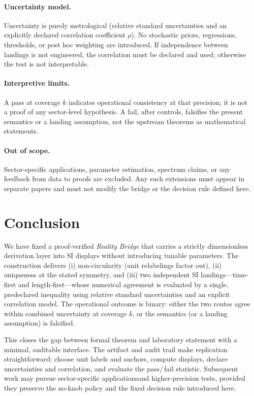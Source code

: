 \documentclass[11pt]{article}
\theoremstyle{plain}
\theoremstyle{definition}
\theoremstyle{remark}
\begin{document}
\paragraph{Uncertainty model.}
Uncertainty is purely metrological (relative standard uncertainties and an explicitly declared correlation coefficient \(\rho\)). No stochastic priors, regressions, thresholds, or post hoc weighting are introduced. If independence between landings is not engineered, the correlation must be declared and used; otherwise the test is not interpretable.

\paragraph{Interpretive limits.}
A pass at coverage \(k\) indicates operational consistency at that precision; it is not a proof of any sector-level hypothesis. A fail, after controls, falsifies the present semantics or a landing assumption, not the upstream theorems as mathematical statements.

\paragraph{Out of scope.}
Sector-specific applications, parameter estimation, spectrum claims, or any feedback from data to proofs are excluded. Any such extensions must appear in separate papers and must not modify the bridge or the decision rule defined here.

\section{Conclusion}

We have fixed a proof-verified \emph{Reality Bridge} that carries a strictly dimensionless derivation layer into SI displays without introducing tunable parameters. The construction delivers (i) non-circularity (unit relabelings factor out), (ii) uniqueness at the stated symmetry, and (iii) two independent SI landings—time-first and length-first—whose numerical agreement is evaluated by a single, pre\-declared inequality using relative standard uncertainties and an explicit correlation model. The operational outcome is binary: either the two routes agree within combined uncertainty at coverage \(k\), or the semantics (or a landing assumption) is falsified.

This closes the gap between formal theorem and laboratory statement with a minimal, auditable interface. The artifact and audit trail make replication straightforward: choose unit labels and anchors, compute displays, declare uncertainties and correlation, and evaluate the pass/\,fail statistic. Subsequent work may pursue sector-specific applications\linebreak and higher-precision tests, provided they preserve the no-knob policy and the fixed decision rule introduced here.
\end{document}
